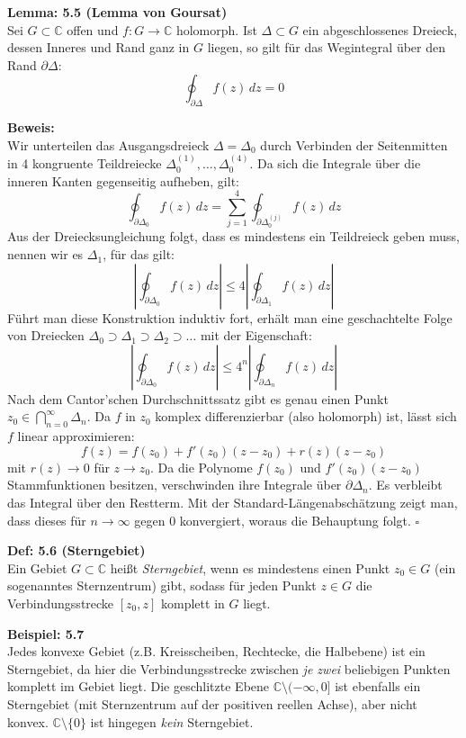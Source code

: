 \vspace{1em}
\noindent\textbf{Lemma: 5.5 (Lemma von Goursat)} \\
Sei $G \subset \mathbb{C}$ offen und $f: G \rightarrow \mathbb{C}$ holomorph. Ist $\Delta \subset G$ ein abgeschlossenes Dreieck, dessen Inneres und Rand ganz in $G$ liegen, so gilt für das Wegintegral über den Rand $\partial\Delta$:
\[
\oint_{\partial\Delta} f(z) \, dz = 0
\]

\vspace{1em}
\noindent\textbf{Beweis:} \\
Wir unterteilen das Ausgangsdreieck $\Delta = \Delta_0$ durch Verbinden der Seitenmitten in 4 kongruente Teildreiecke $\Delta_0^{(1)}, \dots, \Delta_0^{(4)}$. Da sich die Integrale über die inneren Kanten gegenseitig aufheben, gilt:
\[
\oint_{\partial\Delta_0} f(z) \, dz = \sum_{j=1}^{4} \oint_{\partial\Delta_0^{(j)}} f(z) \, dz
\]
Aus der Dreiecksungleichung folgt, dass es mindestens ein Teildreieck geben muss, nennen wir es $\Delta_1$, für das gilt:
\[
\left| \oint_{\partial\Delta_0} f(z) \, dz \right| \le 4 \left| \oint_{\partial\Delta_1} f(z) \, dz \right|
\]
Führt man diese Konstruktion induktiv fort, erhält man eine geschachtelte Folge von Dreiecken $\Delta_0 \supset \Delta_1 \supset \Delta_2 \supset \dots$ mit der Eigenschaft:
\[
\left| \oint_{\partial\Delta_0} f(z) \, dz \right| \le 4^n \left| \oint_{\partial\Delta_n} f(z) \, dz \right|
\]
Nach dem Cantor'schen Durchschnittssatz gibt es genau einen Punkt $z_0 \in \bigcap_{n=0}^{\infty} \Delta_n$. Da $f$ in $z_0$ komplex differenzierbar (also holomorph) ist, lässt sich $f$ linear approximieren:
\[
f(z) = f(z_0) + f'(z_0)(z-z_0) + r(z)(z-z_0)
\]
mit $r(z) \rightarrow 0$ für $z \rightarrow z_0$. Da die Polynome $f(z_0)$ und $f'(z_0)(z-z_0)$ Stammfunktionen besitzen, verschwinden ihre Integrale über $\partial\Delta_n$. Es verbleibt das Integral über den Restterm. Mit der Standard-Längenabschätzung zeigt man, dass dieses für $n \rightarrow \infty$ gegen $0$ konvergiert, woraus die Behauptung folgt. \hfill $\square$

\vspace{1em}
\noindent\textbf{Def: 5.6 (Sterngebiet)} \\
Ein Gebiet $G \subset \mathbb{C}$ heißt \textit{Sterngebiet}, wenn es mindestens einen Punkt $z_0 \in G$ (ein sogenanntes Sternzentrum) gibt, sodass für jeden Punkt $z \in G$ die Verbindungsstrecke $[z_0, z]$ komplett in $G$ liegt.

\vspace{1em}
\noindent\textbf{Beispiel: 5.7} \\
Jedes konvexe Gebiet (z.B. Kreisscheiben, Rechtecke, die Halbebene) ist ein Sterngebiet, da hier die Verbindungsstrecke zwischen \textit{je zwei} beliebigen Punkten komplett im Gebiet liegt. Die geschlitzte Ebene $\mathbb{C} \setminus (-\infty, 0]$ ist ebenfalls ein Sterngebiet (mit Sternzentrum auf der positiven reellen Achse), aber nicht konvex. $\mathbb{C} \setminus \{0\}$ ist hingegen \textit{kein} Sterngebiet.

